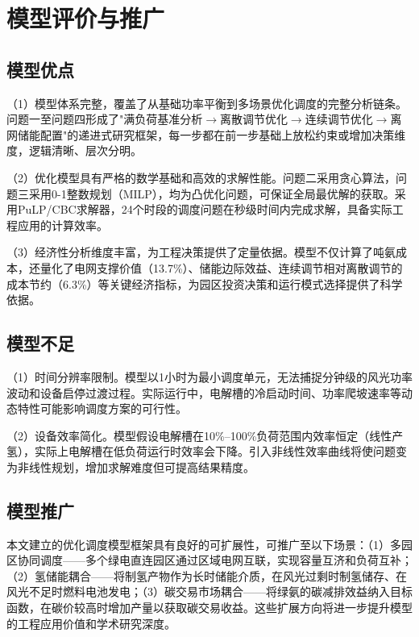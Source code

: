 \section{模型评价与推广}

\subsection{模型优点}

（1）模型体系完整，覆盖了从基础功率平衡到多场景优化调度的完整分析链条。问题一至问题四形成了"满负荷基准分析$\rightarrow$离散调节优化$\rightarrow$连续调节优化$\rightarrow$离网储能配置"的递进式研究框架，每一步都在前一步基础上放松约束或增加决策维度，逻辑清晰、层次分明。

（2）优化模型具有严格的数学基础和高效的求解性能。问题二采用贪心算法，问题三采用0-1整数规划（MILP），均为凸优化问题，可保证全局最优解的获取。采用PuLP/CBC求解器，24个时段的调度问题在秒级时间内完成求解，具备实际工程应用的计算效率。

（3）经济性分析维度丰富，为工程决策提供了定量依据。模型不仅计算了吨氨成本，还量化了电网支撑价值（13.7\%）、储能边际效益、连续调节相对离散调节的成本节约（6.3\%）等关键经济指标，为园区投资决策和运行模式选择提供了科学依据。

\subsection{模型不足}

（1）时间分辨率限制。模型以1小时为最小调度单元，无法捕捉分钟级的风光功率波动和设备启停过渡过程。实际运行中，电解槽的冷启动时间、功率爬坡速率等动态特性可能影响调度方案的可行性。

（2）设备效率简化。模型假设电解槽在10\%--100\%负荷范围内效率恒定（线性产氢），实际上电解槽在低负荷运行时效率会下降。引入非线性效率曲线将使问题变为非线性规划，增加求解难度但可提高结果精度。

\subsection{模型推广}

本文建立的优化调度模型框架具有良好的可扩展性，可推广至以下场景：（1）多园区协同调度——多个绿电直连园区通过区域电网互联，实现容量互济和负荷互补；（2）氢储能耦合——将制氢产物作为长时储能介质，在风光过剩时制氢储存、在风光不足时燃料电池发电；（3）碳交易市场耦合——将绿氨的碳减排效益纳入目标函数，在碳价较高时增加产量以获取碳交易收益。这些扩展方向将进一步提升模型的工程应用价值和学术研究深度。
